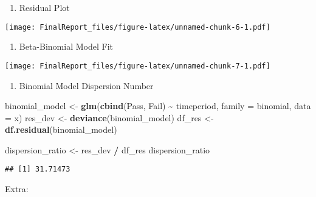 \documentclass[
]{article}
\newenvironment{Shaded}{\begin{snugshade}}{\end{snugshade}}
\newcommand{\AttributeTok}[1]{\textcolor[rgb]{0.13,0.29,0.53}{#1}}
\newcommand{\FunctionTok}[1]{\textcolor[rgb]{0.13,0.29,0.53}{\textbf{#1}}}
\newcommand{\NormalTok}[1]{#1}
\newcommand{\OtherTok}[1]{\textcolor[rgb]{0.56,0.35,0.01}{#1}}
\newcommand{\SpecialCharTok}[1]{\textcolor[rgb]{0.81,0.36,0.00}{\textbf{#1}}}
\providecommand{\tightlist}{%
  \setlength{\itemsep}{0pt}\setlength{\parskip}{0pt}}
\begin{document}
\begin{enumerate}
\def\labelenumi{\arabic{enumi}.}
\setcounter{enumi}{4}
\tightlist
\item
  Residual Plot
\end{enumerate}

\texttt{[image: FinalReport\_files/figure-latex/unnamed-chunk-6-1.pdf]}

\begin{enumerate}
\def\labelenumi{\arabic{enumi}.}
\setcounter{enumi}{5}
\tightlist
\item
  Beta-Binomial Model Fit
\end{enumerate}

\texttt{[image: FinalReport\_files/figure-latex/unnamed-chunk-7-1.pdf]}

\begin{enumerate}
\def\labelenumi{\arabic{enumi}.}
\setcounter{enumi}{6}
\tightlist
\item
  Binomial Model Dispersion Number
\end{enumerate}

\begin{Shaded}
\begin{Highlighting}[]
\NormalTok{binomial\_model }\OtherTok{\textless{}{-}} \FunctionTok{glm}\NormalTok{(}\FunctionTok{cbind}\NormalTok{(Pass, Fail) }\SpecialCharTok{\textasciitilde{}}\NormalTok{ timeperiod, }
                      \AttributeTok{family =}\NormalTok{ binomial, }\AttributeTok{data =}\NormalTok{ x)}
\NormalTok{res\_dev }\OtherTok{\textless{}{-}} \FunctionTok{deviance}\NormalTok{(binomial\_model)}
\NormalTok{df\_res  }\OtherTok{\textless{}{-}} \FunctionTok{df.residual}\NormalTok{(binomial\_model)}

\NormalTok{dispersion\_ratio }\OtherTok{\textless{}{-}}\NormalTok{ res\_dev }\SpecialCharTok{/}\NormalTok{ df\_res}
\NormalTok{dispersion\_ratio}
\end{Highlighting}
\end{Shaded}

\begin{verbatim}
## [1] 31.71473
\end{verbatim}

Extra:
\end{document}
